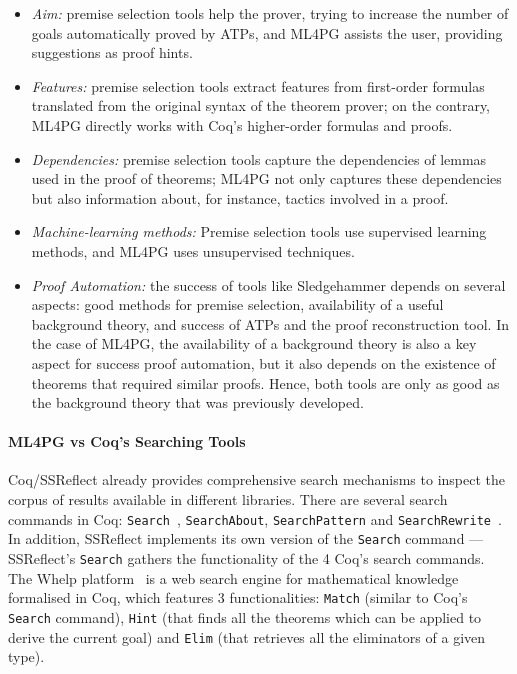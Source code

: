 \begin{itemize}
 \item \emph{Aim:} premise selection tools help the prover, trying to increase the number of goals automatically proved by ATPs, and ML4PG
 assists the user, providing suggestions as proof hints.
 \item \emph{Features:} premise selection tools extract features from first-order formulas translated from the original syntax of the
 theorem prover; on the contrary, ML4PG directly works with Coq's higher-order formulas and proofs. 
 \item \emph{Dependencies:} premise selection tools capture the dependencies of lemmas used in the proof of theorems; ML4PG not only 
 captures these dependencies but also information about, for instance, tactics involved in a proof.
 \item \emph{Machine-learning methods:} Premise selection tools use supervised learning methods, and ML4PG uses unsupervised techniques.
 \item \emph{Proof Automation:} the success of tools like Sledgehammer depends on several aspects: good methods for premise selection,
 availability of a useful background theory, and success of ATPs and the proof reconstruction tool. In the case of ML4PG, the 
 availability of a background theory is also a key aspect for success proof automation, but it also depends on the existence of 
 theorems that required similar proofs. Hence, both tools are only as good as the background theory that was previously developed. \end{itemize}



\paragraph{ML4PG vs Coq's Searching Tools} Coq/SSReflect already provides comprehensive search mechanisms to inspect the corpus of results available in different libraries.
There are several search commands in Coq:  \lstinline?Search?~, \lstinline?SearchAbout?, \lstinline?SearchPattern?
and \lstinline?SearchRewrite?~\cite{Coq}. In addition, SSReflect implements its own version of the \lstinline?Search?
command \cite{SSReflect} --- SSReflect's \lstinline?Search? gathers the functionality of the 4 Coq's search commands.
The Whelp platform~\cite{AspertiGCTZ04} is a web search engine for mathematical knowledge formalised in Coq, which features 3 functionalities:
\lstinline?Match? (similar to Coq's \lstinline?Search? command), \lstinline?Hint? (that finds all the theorems which can
be applied to derive the current goal) and \lstinline?Elim? (that retrieves all the eliminators of a given type).

